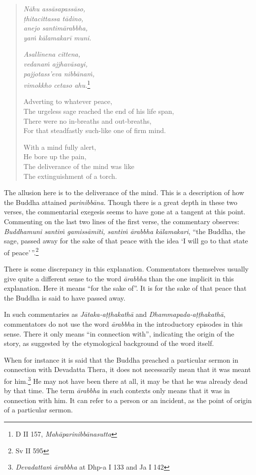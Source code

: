 \begin{quote}
\emph{Nāhu assāsapassāso,}\\
\emph{ṭhitacittassa tādino,}\\
\emph{anejo santimārabbha,}\\
\emph{yaṁ kālamakarī muni.}

\emph{Asallīnena cittena,}\\
\emph{vedanaṁ ajjhavāsayi,}\\
\emph{pajjotass'eva nibbānaṁ,}\\
\emph{vimokkho cetaso ahu.}\footnote{D II 157, \emph{Mahāparinibbānasutta}}

Adverting to whatever peace,\\
The urgeless sage reached the end of his life span,\\
There were no in-breaths and out-breaths,\\
For that steadfastly such-like one of firm mind.

With a mind fully alert,\\
He bore up the pain,\\
The deliverance of the mind was like\\
The extinguishment of a torch.
\end{quote}

The allusion here is to the deliverance of the mind. This is a description of how the Buddha attained \emph{parinibbāna}. Though there is a great depth in these two verses, the commentarial exegesis seems to have gone at a tangent at this point. Commenting on the last two lines of the first verse, the commentary observes: \emph{Buddhamuni santiṁ gamissāmīti, santiṁ ārabbha kālamakari}, ``the Buddha, the sage, passed away for the sake of that peace with the idea `I will go to that state of peace'\,''.\footnote{Sv II 595}

There is some discrepancy in this explanation. Commentators themselves usually give quite a different sense to the word \emph{ārabbha} than the one implicit in this explanation. Here it means ``for the sake of''. It is for the sake of that peace that the Buddha is said to have passed away.

In such commentaries as \emph{Jātaka-aṭṭhakathā} and \emph{Dhammapada-aṭṭhakathā}, commentators do not use the word \emph{ārabbha} in the introductory episodes in this sense. There it only means ``in connection with'', indicating the origin of the story, as suggested by the etymological background of the word itself.

When for instance it is said that the Buddha preached a particular sermon in connection with Devadatta Thera, it does not necessarily mean that it was meant for him.\footnote{\emph{Devadattaṁ ārabbha} at Dhp-a I 133 and Ja I 142} He may not have been there at all, it may be that he was already dead by that time. The term \emph{ārabbha} in such contexts only means that it was in connection with him. It can refer to a person or an incident, as the point of origin of a particular sermon.

